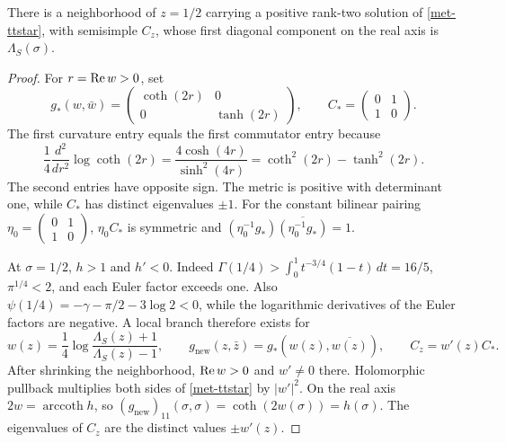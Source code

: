 \begin{proposition}
\label{met-control-proposition}
There is a neighborhood of $z=1/2$ carrying a positive rank-two solution of
\eqref{met-ttstar}, with semisimple $C_z$, whose first diagonal component on
the real axis is $\Lambda_S(\sigma)$.
\end{proposition}
\begin{proof}
For $r=\operatorname{Re} w>0$, set
\begin{equation}
 g_*(w,\bar w)=
 \begin{pmatrix}\coth(2r)&0\\0&\tanh(2r)\end{pmatrix},
 \qquad
 C_* =\begin{pmatrix}0&1\\1&0\end{pmatrix}.
 \label{met-coth-control}
\end{equation}
The first curvature entry equals the first commutator entry because
\begin{equation}
 \frac14\frac{d^2}{dr^2}\log\coth(2r)
 =\frac{4\cosh(4r)}{\sinh^2(4r)}
 =\coth^2(2r)-\tanh^2(2r).
 \label{met-coth-verification}
\end{equation}
The second entries have opposite sign.  The metric is positive with determinant
one, while $C_*$ has distinct eigenvalues $\pm1$.  For the constant bilinear
pairing $\eta_0=\left(\begin{smallmatrix}0&1\\1&0\end{smallmatrix}\right)$,
$\eta_0C_*$ is symmetric and
$(\eta_0^{-1}g_*)\overline{(\eta_0^{-1}g_*)}=1$.

At $\sigma=1/2$, $h>1$ and $h'<0$.  Indeed
$\Gamma(1/4)>\int_0^1t^{-3/4}(1-t)\,dt=16/5$,
$\pi^{1/4}<2$, and each Euler factor exceeds one.  Also
$\psi(1/4)=-\gamma-\pi/2-3\log2<0$, while the logarithmic derivatives of
the Euler factors are negative.  A local branch therefore exists for
\begin{equation}
 w(z)=\frac14\log\frac{\Lambda_S(z)+1}{\Lambda_S(z)-1},
 \qquad
 g_{\mathrm{new}}(z,\bar z)=g_*(w(z),\overline{w(z)}),
 \qquad C_z=w'(z)C_*.
 \label{met-pullback}
\end{equation}
After shrinking the neighborhood, $\operatorname{Re} w>0$ and $w'\ne0$ there.  Holomorphic
pullback multiplies both sides of \eqref{met-ttstar} by $|w'|^2$.
On the real axis $2w=\operatorname{arccoth}h$, so
$(g_{\mathrm{new}})_{11}(\sigma,\sigma)=\coth(2w(\sigma))=h(\sigma)$.
The eigenvalues of $C_z$ are the distinct values $\pm w'(z)$.
\end{proof}

